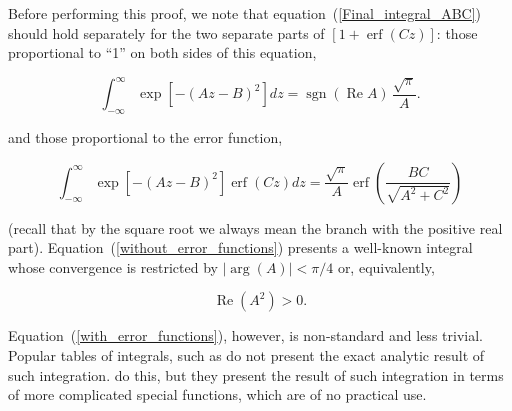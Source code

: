 \documentclass[draft]{agujournal2019}
\begin{document}
{Before performing this proof, we note that equation~(\ref{Final_integral_ABC})
should hold separately for the two separate parts of $\left[
1+\operatorname{erf}\left(  Cz\right)  \right]  $: those proportional to
``1'' on both sides of this equation,
\begin{linenomath*}
\begin{equation}
\int_{-\infty}^{\infty}\exp\left[  -\left(  Az-B\right)  ^{2}\right]
dz=\operatorname{sgn}(\operatorname{Re}A)\,\frac{\sqrt{\pi}}{A}. 
\label{without_error_functions}
\end{equation}
\end{linenomath*}
and those proportional to the error function,
\begin{linenomath*}
\begin{equation}
\int_{-\infty}^{\infty}\exp\left[  -\left(  Az-B\right)  ^{2}\right]
\operatorname{erf}\left(  Cz\right)  dz=\frac{\sqrt{\pi}}{A}\operatorname{erf}%
\left(  \frac{BC}{\sqrt{A^{2}+C^{2}}}\right) 
\label{with_error_functions}
\end{equation}
\end{linenomath*}
(recall that by the square root we always mean the branch with the positive real part). 
Equation~(\ref{without_error_functions}) presents a 
well-known integral whose convergence is restricted by $\left\vert
\arg(A)\right\vert <\pi/4$ or, equivalently,
\begin{linenomath*}
\begin{equation}
\operatorname{Re}(A^{2})>0. 
\label{Re(A^2)>0}
\end{equation}
\end{linenomath*}
Equation~(\ref{with_error_functions}), however, is non-standard and less
trivial. Popular tables of integrals, such as  do not present the exact analytic result of such integration. 
 do this, but they present the result of such integration 
in terms of more complicated special functions, which are of no practical use. 

}
\end{document}
